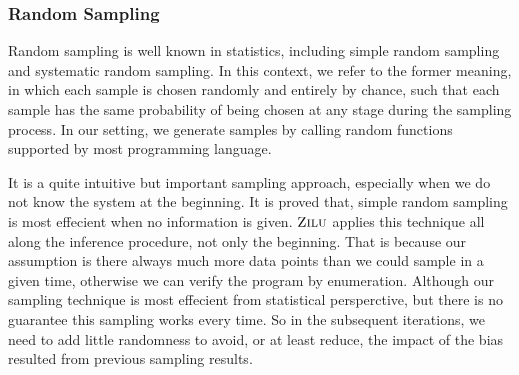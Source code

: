 
\subsubsection{Random Sampling}
Random sampling is well known in statistics, including simple random sampling and systematic random sampling.
In this context, we refer to the former meaning, in which each sample is chosen randomly and entirely by chance, 
such that each sample has the same probability of being chosen at any stage during the sampling process.
In our setting, we generate samples by calling random functions supported by most programming language.

It is a quite intuitive but important sampling approach, especially when we do not know the system at the beginning. 
It is proved that, simple random sampling is most effecient when no information is given.
$\textsc{Zilu}$ applies this technique all along the inference procedure, not only the beginning. 
That is because our assumption is there always much more data points than we could sample in a given time,
otherwise we can verify the program by enumeration.
Although our sampling technique is most effecient from statistical persperctive, 
but there is no guarantee this sampling works every time.
So in the subsequent iterations, we need to add little randomness to avoid, or at least reduce, 
the impact of the bias resulted from previous sampling results.


